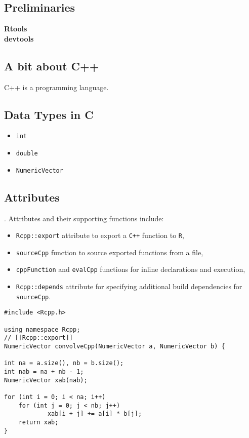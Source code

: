 \documentclass[]{article}
\begin{document}
\subsection{Preliminaries}
\textbf{Rtools}\\
\textbf{devtools}\\

\subsection{A bit about C++}
C++ is a programming language.


\newpage
\subsection{Data Types in C}

\begin{itemize}
\item \texttt{int}
\item \texttt{double}
\item \texttt{NumericVector}
\end{itemize}
\subsection{Attributes}

. Attributes and their
supporting functions include:
\begin{itemize}
\item \texttt{Rcpp::export} attribute to export a \texttt{C++} function to \texttt{R},
\item \texttt{sourceCpp} function to source exported functions from a file,
\item \texttt{cppFunction} and \texttt{evalCpp} functions for inline declarations and execution,
\item \texttt{Rcpp::depends} attribute for specifying additional build dependencies for \texttt{sourceCpp}.
\end{itemize}


\begin{framed}
\begin{verbatim}
#include <Rcpp.h>

using namespace Rcpp;
// [[Rcpp::export]]
NumericVector convolveCpp(NumericVector a, NumericVector b) {

int na = a.size(), nb = b.size();
int nab = na + nb - 1;
NumericVector xab(nab);

for (int i = 0; i < na; i++)
    for (int j = 0; j < nb; j++)
            xab[i + j] += a[i] * b[j];
    return xab;
}
\end{verbatim}
\end{framed}
\end{document}
